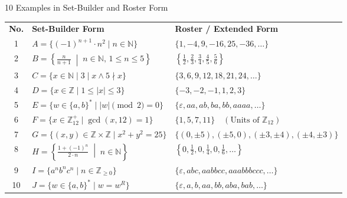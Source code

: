 \documentclass[aspectratio=169]{beamer}
\begin{document}
\begin{frame}{10 Examples in Set-Builder and Roster Form}

\scriptsize

\begin{table}
\centering

\begin{tabular}{c p{6.3cm} p{5.0cm}}

\toprule
\textbf{No.} &
\textbf{Set-Builder Form} &
\textbf{Roster / Extended Form}
\\





1 &
$
A = \{ (-1)^{n+1} \cdot n^2 \mid n \in \mathbb{N} \}
$
&
$
\{1, -4, 9, -16, 25, -36, \ldots\}
$
\\[0.18cm]

2 &
$
B = \left\{ \frac{n}{n+1} \;\middle|\; n \in \mathbb{N}, \, 1 \le n \le 5 \right\}
$
&
$
\left\{ \frac{1}{2}, \frac{2}{3}, \frac{3}{4}, \frac{4}{5}, \frac{5}{6} \right\}
$
\\[0.18cm]

3 &
$
C = \{ x\in \mathbb{N} \mid 3 \mid x \land 5 \nmid x \}
$
&
$
\{3, 6, 9, 12, 18, 21, 24, \ldots\}
$
\\[0.18cm]

4 &
$
D = \{ x \in \mathbb{Z} \mid 1 \le |x| \le 3 \}
$
&
$
\{-3, -2, -1, 1, 2, 3\}
$
\\[0.18cm]

5 &
$
E = \{ w \in \{a, b\}^* \mid |w| \pmod 2 = 0 \}
$
&
$
\{\varepsilon, aa, ab, ba, bb, aaaa, \ldots\}
$
\\[0.18cm]



6 &
$
F = \{ x \in \mathbb{Z}_{12}^+ \mid \gcd(x, 12) = 1 \}
$
&
$
\{1, 5, 7, 11\} \quad (\text{Units of } \mathbb{Z}_{12})
$
\\[0.18cm]

7 &
$
G = \{ (x, y) \in \mathbb{Z} \times \mathbb{Z} \mid x^2 + y^2 = 25 \}
$
&
$
\{(0, \pm 5), (\pm 5, 0), (\pm 3, \pm 4), (\pm 4, \pm 3)\}
$
\\[0.18cm]

8 &
$
H = \left\{ \frac{1+(-1)^n}{2 \cdot n} \;\middle|\; n \in \mathbb{N} \right\}
$
&
$
\left\{ 0, \frac{1}{2}, 0, \frac{1}{4}, 0, \frac{1}{6}, \ldots \right\}
$
\\[0.18cm]

9 &
$
I = \{ a^n b^n c^n \mid n \in \mathbb{Z}_{\ge 0} \}
$
&
$
\{\varepsilon, abc, aabbcc, aaabbbccc, \ldots\}
$
\\[0.18cm]

10 &
$
J = \{ w \in \{a, b\}^* \mid w = w^R \}
$
&
$
\{\varepsilon, a, b, aa, bb, aba, bab, \ldots\}
$
\\

\bottomrule

\end{tabular}

\end{table}

\end{frame}
\end{document}
